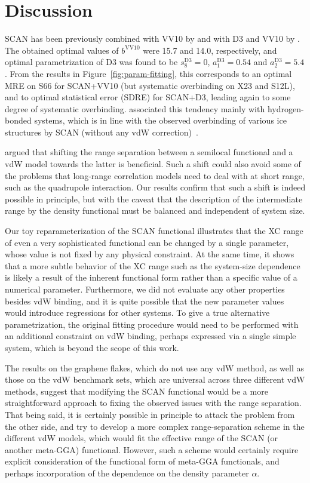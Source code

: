 \section{Discussion}

SCAN has been previously combined with VV10 by \citet{PengPRX16} and with D3 and VV10 by \citet{BrandenburgPRB16}.
The obtained optimal values of $b^\text{VV10}$ were 15.7 and 14.0, respectively, and optimal parametrization of D3 was found to be $s_8^\text{D3}=0$, $a_1^\text{D3}=0.54$ and $a_2^\text{D3}=5.4$.
From the results in Figure~\ref{fig:param-fitting}, this corresponds to an optimal MRE on S66 for SCAN+VV10 (but systematic overbinding on X23 and S12L), and to optimal statistical error (SDRE) for SCAN+D3, leading again to some degree of systematic overbinding.
\citet{BrandenburgPRB16} associated this tendency mainly with hydrogen-bonded systems, which is in line with the observed overbinding of various ice structures by SCAN (without any vdW correction)~\cite{ChenPRB16}.

\citet{PengPRX16} argued that shifting the range separation between a semilocal functional and a vdW model towards the latter is beneficial.
Such a shift could also avoid some of the problems that long-range correlation models need to deal with at short range, such as the quadrupole interaction.
Our results confirm that such a shift is indeed possible in principle, but with the caveat that the description of the intermediate range by the density functional must be balanced and independent of system size.

Our toy reparameterization of the SCAN functional illustrates that the XC range of even a very sophisticated functional can be changed by a single parameter, whose value is not fixed by any physical constraint.
At the same time, it shows that a more subtle behavior of the XC range such as the system-size dependence is likely a result of the inherent functional form rather than a specific value of a numerical parameter.
Furthermore, we did not evaluate any other properties besides vdW binding, and it is quite possible that the new parameter values would introduce regressions for other systems.
To give a true alternative parametrization, the original fitting procedure would need to be performed with an additional constraint on vdW binding, perhaps expressed via a single simple system, which is beyond the scope of this work.

The results on the graphene flakes, which do not use any vdW method, as well as those on the vdW benchmark sets, which are universal across three different vdW methods, suggest that modifying the SCAN functional would be a more straightforward approach to fixing the observed issues with the range separation.
That being said, it is certainly possible in principle to attack the problem from the other side, and try to develop a more complex range-separation scheme in the different vdW models, which would fit the effective range of the SCAN (or another meta-GGA) functional.
However, such a scheme would certainly require explicit consideration of the functional form of meta-GGA functionals, and perhaps incorporation of the dependence on the density parameter $\alpha$.

